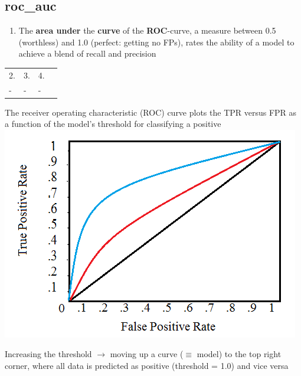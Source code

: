 \documentclass[12pt,a4paper]{article}
\begin{document}
\subsection{roc\_auc}
\begin{enumerate}
\item The \textbf{area under} the \textbf{curve} of the \textbf{ROC}-curve, a measure between 0.5 (worthless) and 1.0 (perfect: getting no FPs), rates the ability of a model to achieve a blend of recall and precision
\end{enumerate}
\begin{tabular}{|l|l|l|l|}
\hline
2. & 3. & 4.\\ 
- & -& - \\ \hline
\end{tabular}
\begin{description}
\item The receiver operating characteristic (ROC) curve plots the TPR versus FPR as a function of the model’s threshold for classifying a positive
\includegraphics[scale=0.5]{resources/3/ROCcurve}
\item Increasing the threshold $\rightarrow$ moving up a curve ($\equiv$ model) to the top right corner, where all data is predicted as positive (threshold = 1.0) and vice versa
\end{description}
%
\end{document}
